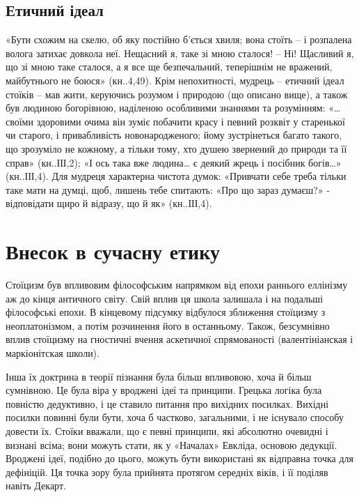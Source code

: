 \documentclass[14pt]{extarticle} %
\begin{document}
\subsection{Етичний ідеал}%
«Бути схожим на скелю, об яку постійно б’ється хвиля; вона стоїть – і розпалена волога затихає довкола неї. Нещасний я, таке зі
мною сталося! – Ні! Щасливий я, що зі мною таке сталося, а я все ще безпечальний, теперішнім не вражений, майбутнього не боюся» (кн..4,49).
Крім непохитності, мудрець – етичний ідеал стоїків – мав жити, керуючись розумом і природою (що описано вище), а також був людиною богорівною,
наділеною особливими знаннями та розумінням: «…своїми здоровими очима він зуміє побачити красу і певний розквіт у старенької чи старого, і 
привабливість новонародженого; йому зустрінеться багато такого, що зрозуміло не кожному, а тільки тому, хто душею звернений до природи та її справ»
(кн..ІІІ,2); «І ось така вже людина… є деякий жрець і посібник богів…» (кн..ІІІ,4). Для мудреця характерна чистота думок: «Привчати себе
треба тільки таке мати на думці, щоб, лишень тебе спитають: «Про що зараз думаєш?» - відповідати щиро й відразу, що й як» (кн..ІІІ,4). 
\section{Внесок в сучасну етику}%
Стоїцизм був впливовим філософським напрямком від епохи раннього еллінізму аж до кінця античного світу. Свій вплив ця школа залишала і
на подальші філософські епохи. В кінцевому підсумку відбулося зближення стоїцизму з неоплатонізмом, а потім розчинення його в останньому.
Також, безсумнівно вплив стоїцизму на гностичні вчення аскетичної спрямованості (валентініанская і маркіонітская школи). 

Інша їх доктрина в теорії пізнання була більш впливовою, хоча й більш сумнівною. Це була віра у вроджені ідеї та принципи. Грецька логіка
була повністю дедуктивно, і це ставило питання про вихідних посилках. Вихідні посилки повинні були бути, хоча б частково, загальними,
і не існувало способу довести їх. Стоїки вважали, що є певні принципи, які абсолютно очевидні і визнані всіма; вони можуть стати,
як у «Началах» Евкліда, основою дедукції. Вроджені ідеї, подібно до цього, можуть бути використані як відправна точка для дефініцій. Ця точка
зору була прийнята протягом середніх віків, і її поділяв навіть Декарт.
\end{document}
